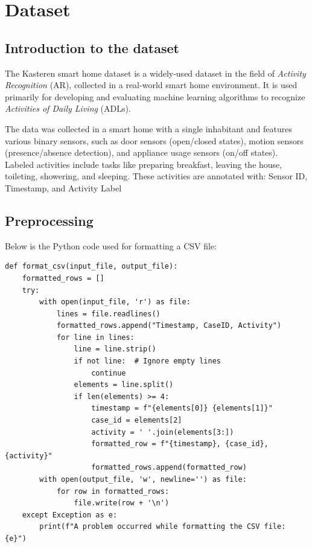 \section{Dataset}
\subsection{Introduction to the dataset}
The Kasteren smart home dataset is a widely-used dataset in the field of \textit{Activity Recognition} (AR), collected in a real-world smart home environment. It is used primarily for developing and evaluating machine learning algorithms to recognize \textit{Activities of Daily Living} (ADLs).

The data was collected in a smart home with a single inhabitant and features various binary sensors, such as door sensors (open/closed states), motion sensors (presence/absence detection), and appliance usage sensors (on/off states). Labeled activities include tasks like preparing breakfast, leaving the house, toileting, showering, and sleeping. These activities are annotated with: Sensor ID, Timestamp, and Activity Label

\subsection{Preprocessing}

Below is the Python code used for formatting a CSV file:

\begin{lstlisting}[caption={Format CSV Function}]
def format_csv(input_file, output_file):
    formatted_rows = []
    try:
        with open(input_file, 'r') as file:
            lines = file.readlines()
            formatted_rows.append("Timestamp, CaseID, Activity")
            for line in lines:
                line = line.strip()
                if not line:  # Ignore empty lines
                    continue
                elements = line.split()
                if len(elements) >= 4:  
                    timestamp = f"{elements[0]} {elements[1]}"
                    case_id = elements[2]
                    activity = ' '.join(elements[3:])
                    formatted_row = f"{timestamp}, {case_id}, {activity}"
                    formatted_rows.append(formatted_row)
        with open(output_file, 'w', newline='') as file:
            for row in formatted_rows:
                file.write(row + '\n')
    except Exception as e:
        print(f"A problem occurred while formatting the CSV file: {e}")
\end{lstlisting}

